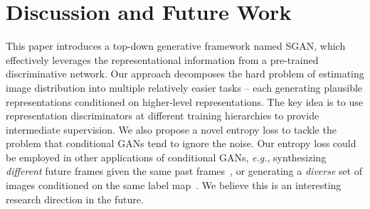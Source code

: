 \documentclass[10pt,twocolumn,letterpaper]{article}
\begin{document}
\section{Discussion and Future Work}
\label{discussion}

This paper introduces a top-down generative framework named SGAN, which effectively leverages the representational information from a pre-trained discriminative network. Our approach decomposes the hard problem of estimating image distribution into multiple relatively easier tasks -- each generating plausible representations conditioned on higher-level representations. The key idea is to use representation discriminators at different training hierarchies to provide intermediate supervision. We also propose a novel entropy loss to tackle the problem that conditional GANs tend to ignore the noise. Our entropy loss could be employed in other applications of conditional GANs, \emph{e.g.}, synthesizing \emph{different} future frames given the same past frames~\cite{mathieu2016deep}, or generating a \emph{diverse} set of images conditioned on the same label map~\cite{pix2pix2016}. We believe this is an interesting research direction in the future.


\end{document}
